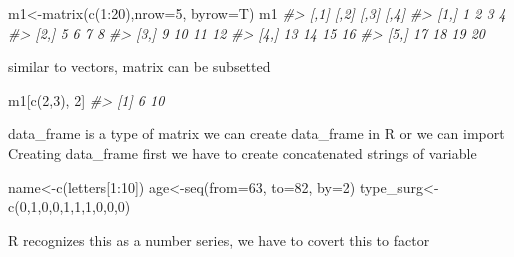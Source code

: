 \documentclass[
]{article}
\newenvironment{Shaded}{\begin{snugshade}}{\end{snugshade}}
\newcommand{\AttributeTok}[1]{\textcolor[rgb]{0.77,0.63,0.00}{#1}}
\newcommand{\CommentTok}[1]{\textcolor[rgb]{0.56,0.35,0.01}{\textit{#1}}}
\newcommand{\DecValTok}[1]{\textcolor[rgb]{0.00,0.00,0.81}{#1}}
\newcommand{\FunctionTok}[1]{\textcolor[rgb]{0.00,0.00,0.00}{#1}}
\newcommand{\NormalTok}[1]{#1}
\newcommand{\OtherTok}[1]{\textcolor[rgb]{0.56,0.35,0.01}{#1}}
\newcommand{\SpecialCharTok}[1]{\textcolor[rgb]{0.00,0.00,0.00}{#1}}
\begin{document}
\begin{Shaded}
\begin{Highlighting}[]
\NormalTok{m1}\OtherTok{\textless{}{-}}\FunctionTok{matrix}\NormalTok{(}\FunctionTok{c}\NormalTok{(}\DecValTok{1}\SpecialCharTok{:}\DecValTok{20}\NormalTok{),}\AttributeTok{nrow=}\DecValTok{5}\NormalTok{, }\AttributeTok{byrow=}\NormalTok{T)}
\NormalTok{m1}
\CommentTok{\#\textgreater{}      [,1] [,2] [,3] [,4]}
\CommentTok{\#\textgreater{} [1,]    1    2    3    4}
\CommentTok{\#\textgreater{} [2,]    5    6    7    8}
\CommentTok{\#\textgreater{} [3,]    9   10   11   12}
\CommentTok{\#\textgreater{} [4,]   13   14   15   16}
\CommentTok{\#\textgreater{} [5,]   17   18   19   20}
\end{Highlighting}
\end{Shaded}

similar to vectors, matrix can be subsetted

\begin{Shaded}
\begin{Highlighting}[]
\NormalTok{m1[}\FunctionTok{c}\NormalTok{(}\DecValTok{2}\NormalTok{,}\DecValTok{3}\NormalTok{), }\DecValTok{2}\NormalTok{]}
\CommentTok{\#\textgreater{} [1]  6 10}
\end{Highlighting}
\end{Shaded}

data\_frame is a type of matrix
we can create data\_frame in R or we can import
Creating data\_frame
first we have to create concatenated strings of variable

\begin{Shaded}
\begin{Highlighting}[]
\NormalTok{name}\OtherTok{\textless{}{-}}\FunctionTok{c}\NormalTok{(letters[}\DecValTok{1}\SpecialCharTok{:}\DecValTok{10}\NormalTok{])}
\NormalTok{age}\OtherTok{\textless{}{-}}\FunctionTok{seq}\NormalTok{(}\AttributeTok{from=}\DecValTok{63}\NormalTok{, }\AttributeTok{to=}\DecValTok{82}\NormalTok{, }\AttributeTok{by=}\DecValTok{2}\NormalTok{)}
\NormalTok{type\_surg}\OtherTok{\textless{}{-}} \FunctionTok{c}\NormalTok{(}\DecValTok{0}\NormalTok{,}\DecValTok{1}\NormalTok{,}\DecValTok{0}\NormalTok{,}\DecValTok{0}\NormalTok{,}\DecValTok{1}\NormalTok{,}\DecValTok{1}\NormalTok{,}\DecValTok{1}\NormalTok{,}\DecValTok{0}\NormalTok{,}\DecValTok{0}\NormalTok{,}\DecValTok{0}\NormalTok{)}
\end{Highlighting}
\end{Shaded}

R recognizes this as a number series, we have to covert this to factor
\end{document}
